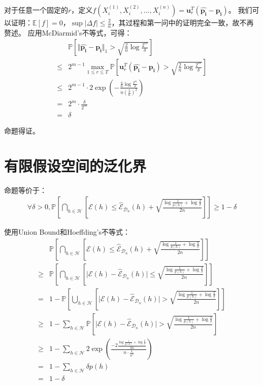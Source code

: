 \documentclass[12pt, a4paper]{article}
\newcommand{\under}[1]{\mathop{#1}\limits_}
\newcommand{\expect}{{\mathbb{E}}}
\newcommand{\prob}{{\mathbb{P}}}
\newcommand{\EE}{{\mathcal{E}}}
\newcommand{\HH}{{\mathcal{H}}}
\newcommand{\DD}{{\mathcal{D}}}
\begin{document}
\begin{enumerate}
        对于任意一个固定的$r$，定义$f(X_i^{(1)}, X_i^{(2)}, ..., X_i^{(n)}) = \bm{u}_r^T (\bm{\hat{p_i}} - \bm{p_i})$。
        我们可以证明：$\expect[f] = 0$，$\sup \vert \Delta f \vert \le \frac{2}{n}$，其过程和第一问中的证明完全一致，故不再赘述。
        应用McDiarmid's不等式，可得：
        \begin{align*}
        &\prob[\Vert \bm{\hat{p_i}} - \bm{p_i} \Vert_1 > \sqrt{\frac{2}{n} \log \frac{2^m}{\delta}}] \\
        \le& 2^{m - 1} \under{\max}{1 \le r \le T} \prob[\bm{u}_r^T (\bm{\hat{p_i}} - \bm{p_i}) > \sqrt{\frac{2}{n} \log \frac{2^m}{\delta}}] \\
        \le& 2^{m - 1} \cdot 2 \exp(- \frac{\frac{4}{n} \log \frac{2^m}{\delta}}{n (\frac{2}{n})^2}) \\
        =& 2^m \cdot \frac{\delta}{2^m} \\
        =& \delta
        \end{align*}

        命题得证。

    \end{enumerate}

    \section{有限假设空间的泛化界}

        命题等价于：
        \begin{align*}
        \forall \delta > 0, \prob[\bigcap_{h \in \HH} [\EE(h) \le \hat{\EE}_{\DD_n}(h) + \sqrt{\frac{\log \frac{1}{p(h)} + \log \frac{2}{\delta}}{2n}}]] \ge 1 - \delta
        \end{align*}

        使用Union Bound和Hoeffding's不等式：
        \begin{align*}
        &\prob[\bigcap_{h \in \HH} [\EE(h) \le \hat{\EE}_{\DD_n}(h) + \sqrt{\frac{\log \frac{1}{p(h)} + \log \frac{2}{\delta}}{2n}}]] \\
        \ge& \prob[\bigcap_{h \in \HH} [\vert \EE(h) - \hat{\EE}_{\DD_n}(h) \vert \le \sqrt{\frac{\log \frac{1}{p(h)} + \log \frac{2}{\delta}}{2n}}]] \\
        =& 1 - \prob[\bigcup_{h \in \HH} [\vert \EE(h) - \hat{\EE}_{\DD_n}(h) \vert > \sqrt{\frac{\log \frac{1}{p(h)} + \log \frac{2}{\delta}}{2n}}]] \\
        \ge& 1 - \sum_{h \in \HH} \prob[\vert \EE(h) - \hat{\EE}_{\DD_n}(h) \vert > \sqrt{\frac{\log \frac{1}{p(h)} + \log \frac{2}{\delta}}{2n}}] \\
        \ge& 1 - \sum_{h \in \HH} 2 \exp(\frac{-2 \frac{\log \frac{1}{p(h)} + \log \frac{2}{\delta}}{2n}}{n \cdot \frac{1}{n^2}}) \\
        =& 1 - \sum_{h \in \HH} \delta p(h) \\
        =& 1 - \delta
        \end{align*}
\end{document}
